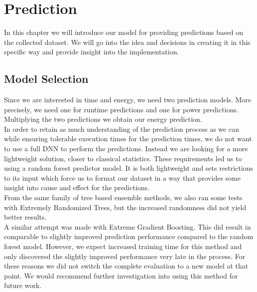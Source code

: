 \chapter{Prediction}\label{chap:contrib2}

In this chapter we will introduce our model for providing predictions based on the collected dataset. We will go into the idea and decisions in creating it in this specific way and provide insight into the implementation.


\section{Model Selection}
Since we are interested in time and energy, we need two prediction models. More precisely, we need one for runtime predictions and one for power predictions. Multiplying the two predictions we obtain our energy prediction. \\
In order to retain as much understanding of the prediction process as we can while ensuring tolerable execution times for the prediction times, we do not want to use a full DNN to perform the predictions. Instead we are looking for a more lightweight solution, closer to classical statistics. These requirements led us to using a random forest predictor model. It is both lightweight and sets restrictions to its input which force us to format our dataset in a way that provides some insight into cause and effect for the predictions. \\
From the same family of tree based ensemble methods, we also ran some tests with Extremely Randomized Trees, but the increased randomness did not yield better results. \\
A similar attempt was made with Extreme Gradient Boosting. This did result in comparable to slightly improved prediction performance compared to the random forest model. However, we expect increased training time for this method and only discovered the slightly improved performance very late in the process. For these reasons we did not switch the complete evaluation to a new model at that point. We would recommend further investigation into using this method for future work.



